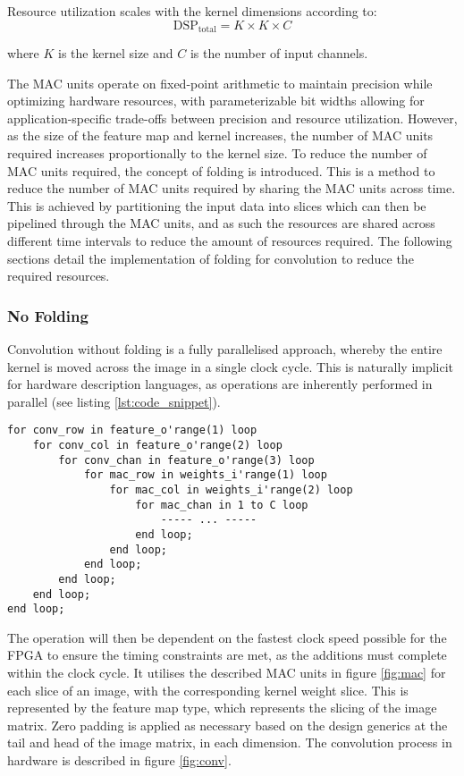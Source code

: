 Resource utilization scales with the kernel dimensions according to:
\begin{equation}
    \text{DSP}_{\text{total}} = K \times K \times C
\end{equation}

where $K$ is the kernel size and $C$ is the number of input channels. 

The MAC units operate on fixed-point arithmetic to maintain precision while optimizing hardware resources, with parameterizable bit widths allowing for application-specific trade-offs between precision and resource utilization.
However, as the size of the feature map and kernel increases, the number of MAC units required increases proportionally to the kernel size.
To reduce the number of MAC units required, the concept of folding is introduced.
This is a method to reduce the number of MAC units required by sharing the MAC units across time.
This is achieved by partitioning the input data into slices which can then be pipelined through the MAC units, and as such the resources are shared across different time intervals to reduce the amount of resources required.
The following sections detail the implementation of folding for convolution to reduce the required resources.

\clearpage 
\subsubsection{No Folding}

Convolution without folding is a fully parallelised approach, whereby the entire kernel is moved across the image in a single clock cycle.
This is naturally implicit for hardware description languages, as operations are inherently performed in parallel (see listing \ref{lst:code_snippet}).

\begin{lstlisting}[style=vhdl, caption={Implementation of fully parallelised convolution}, label=lst:code_snippet]
for conv_row in feature_o'range(1) loop
    for conv_col in feature_o'range(2) loop
        for conv_chan in feature_o'range(3) loop            
            for mac_row in weights_i'range(1) loop
                for mac_col in weights_i'range(2) loop
                    for mac_chan in 1 to C loop
                        ----- ... -----
                    end loop;
                end loop;
            end loop;
        end loop;
    end loop;
end loop;
\end{lstlisting}

The operation will then be dependent on the fastest clock speed possible for the FPGA to ensure the timing constraints are met, as the additions must complete within the clock cycle.
It utilises the described MAC units in figure \ref{fig:mac} for each slice of an image, with the corresponding kernel weight slice.
This is represented by the feature map type, which represents the slicing of the image matrix.
Zero padding is applied as necessary based on the design generics at the tail and head of the image matrix, in each dimension.
The convolution process in hardware is described in figure \ref{fig:conv}.



